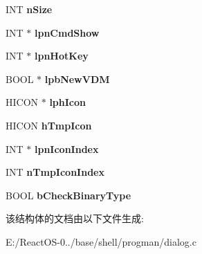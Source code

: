 \begin{DoxyCompactItemize}
I\+NT {\bfseries n\+Size}
\item 
\mbox{\label{struct___p_r_o_g_r_a_m___a_t_t_r_i_b_u_t_e_s___c_o_n_t_e_x_t_a2bd0e8031b8ac28ab32e5b062c66a9c8}} 
I\+NT $\ast$ {\bfseries lpn\+Cmd\+Show}
\item 
\mbox{\label{struct___p_r_o_g_r_a_m___a_t_t_r_i_b_u_t_e_s___c_o_n_t_e_x_t_ac1a15e99b3e0cb6aae4cf1561ca2ac52}} 
I\+NT $\ast$ {\bfseries lpn\+Hot\+Key}
\item 
\mbox{\label{struct___p_r_o_g_r_a_m___a_t_t_r_i_b_u_t_e_s___c_o_n_t_e_x_t_aa430e6b61c6042e103c4411ee79f778f}} 
B\+O\+OL $\ast$ {\bfseries lpb\+New\+V\+DM}
\item 
\mbox{\label{struct___p_r_o_g_r_a_m___a_t_t_r_i_b_u_t_e_s___c_o_n_t_e_x_t_a93dd8b867092022d4576feb307b5e447}} 
H\+I\+C\+ON $\ast$ {\bfseries lph\+Icon}
\item 
\mbox{\label{struct___p_r_o_g_r_a_m___a_t_t_r_i_b_u_t_e_s___c_o_n_t_e_x_t_af695a2704976cfb689dea4e720c71f77}} 
H\+I\+C\+ON {\bfseries h\+Tmp\+Icon}
\item 
\mbox{\label{struct___p_r_o_g_r_a_m___a_t_t_r_i_b_u_t_e_s___c_o_n_t_e_x_t_ac217a2af6f341e377e5ca181ebf61476}} 
I\+NT $\ast$ {\bfseries lpn\+Icon\+Index}
\item 
\mbox{\label{struct___p_r_o_g_r_a_m___a_t_t_r_i_b_u_t_e_s___c_o_n_t_e_x_t_a64d51340e5eed56b4987840e7064de23}} 
I\+NT {\bfseries n\+Tmp\+Icon\+Index}
\item 
\mbox{\label{struct___p_r_o_g_r_a_m___a_t_t_r_i_b_u_t_e_s___c_o_n_t_e_x_t_ab7358ef95961c98dc81a2bbc1488f153}} 
B\+O\+OL {\bfseries b\+Check\+Binary\+Type}
\end{DoxyCompactItemize}


该结构体的文档由以下文件生成\+:\begin{DoxyCompactItemize}
\item 
E\+:/\+React\+O\+S-\/0../base/shell/progman/dialog.\+c\end{DoxyCompactItemize}
